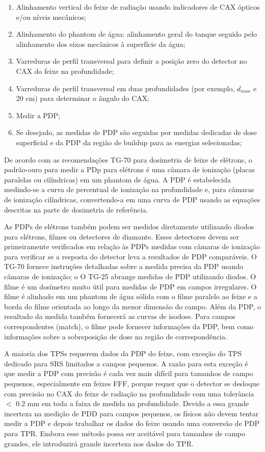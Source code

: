 \documentclass[11pt,a4paper]{article}
\newcounter{exemplo}
\begin{document}
	\begin{enumerate}[label=\textcolor{CarnationPink}{\arabic*${}^\circ $}]
		\item Alinhamento vertical do feixe de radiação usando indicadores de CAX ópticos e/ou níveis mecânicos;
		\item Alinhamento do phantom  de água: alinhamento geral do tanque seguido pelo alinhamento dos eixos mecânicos à superfície da água;
		\item Varreduras de perfil transversal para definir a posição zero do detector no CAX do feixe na profundidade;
		\item Varreduras de perfil transversal em duas profundidades (por exemplo, $d_{max}$ e 20 cm) para determinar o ângulo do CAX;
		\item Medir a PDP;
		\item Se desejado, as medidas de PDP são seguidas por medidas dedicadas de dose superficial e da PDP da região de buildup para as energias selecionadas;
	\end{enumerate}

	De acordo com as recomendações TG-70 para dosimetria de feixe de elétrons, o padrão-ouro para medir a PDp para elétrons é uma câmara de ionização (placas paralelas ou cilíndricas) em um phantom de água. A PDP é estabelecida medindo-se a curva de percentual de ionização na profundidade e, para câmaras de ionização cilíndricas, convertendo-a em uma curva de PDP usando as equações descritas na parte de dosimetria de referência. 
	
	As PDPs de elétrons também podem ser medidos diretamente utilizando diodos para elétrons, filmes ou detectores de diamante. Esses detectores devem ser primeiramente verificados em relação às PDPs medidas com câmaras de ionização para verificar se a resposta do detector leva a resultados de PDP comparáveis. O TG-70 fornece instruções detalhadas sobre a medida precisa da PDP usando câmaras de ionização; o O TG-25 abrange medidas de PDP utilizando diodos. O filme é um dosímetro muito útil para medidas de PDP em campos irregulares. O filme é alinhado em um phantom de água sólida com o filme paralelo ao feixe e a borda do filme orientada ao longo da menor dimensão do campo. Além da PDP, o resultado da medida também fornecerá as curvas de isodose. Para campos correspondentes (match), o filme pode fornecer informações da PDP, bem como informações sobre a sobreposição de dose na região de correspondência.
	
	A maioria dos TPSs requerem dados da PDP do feixe, com exceção do TPS dedicado para SRS limitados a campos pequenos. A razão para esta exceção é que medir a PDP com precisão é cada vez mais difícil para tamanhos de campo pequenos, especialmente em feixes FFF, porque requer que o detector se desloque com precisão no CAX do feixe de radiação na profundidade com uma tolerância $<$ 0.2 mm em toda a faixa de medida na profundidade. Devido a essa grande incerteza na medição de PDD para campos pequenos, os físicos não devem tentar medir a PDP e depois trabalhar os dados do feixe usando uma conversão de PDP para TPR. Embora esse método possa ser aceitável para tamanhos de campo grandes, ele introduzirá grande incerteza nos dados do TPR.
\end{document}
